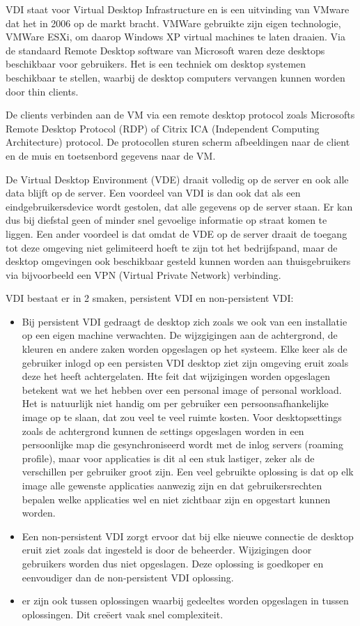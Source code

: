 VDI staat voor Virtual Desktop Infrastructure en is een uitvinding van VMware dat het in 2006 op de markt bracht. VMWare gebruikte zijn eigen technologie, VMWare ESXi, om daarop Windows XP virtual machines te laten draaien. Via de standaard Remote Desktop software van Microsoft waren deze desktops beschikbaar voor gebruikers. Het is een techniek om desktop systemen beschikbaar te stellen, waarbij de desktop computers vervangen kunnen worden door thin clients.

De clients verbinden aan de VM via een remote desktop protocol zoals Microsofts Remote Desktop Protocol (RDP) of Citrix ICA (Independent Computing Architecture) protocol. De protocollen sturen scherm afbeeldingen naar de client en de muis en toetsenbord gegevens naar de VM.

De Virtual Desktop Environment (VDE) draait volledig op de server en ook alle data blijft op de server. Een voordeel van VDI is dan ook dat als een eindgebruikersdevice wordt gestolen, dat alle gegevens op de server staan. Er kan dus bij diefstal geen of minder snel gevoelige informatie op straat komen te liggen. Een ander voordeel is dat omdat de VDE op de server draait de toegang tot deze omgeving niet gelimiteerd hoeft te zijn tot het bedrijfspand, maar de desktop omgevingen ook beschikbaar gesteld kunnen worden aan thuisgebruikers via bijvoorbeeld een VPN (Virtual Private Network) verbinding.

VDI bestaat er in 2 smaken, persistent VDI en non-persistent VDI:
\begin{itemize}
\item Bij persistent VDI gedraagt de desktop zich zoals we ook van een installatie op een eigen machine verwachten. De wijzgigingen aan de achtergrond, de kleuren en andere zaken worden opgeslagen op het systeem. Elke keer als de gebruiker inlogd op een persisten VDI desktop ziet zijn omgeving eruit zoals deze het heeft achtergelaten. Hte feit dat wijzigingen worden opgeslagen betekent wat we het hebben over een personal image of personal workload. Het is natuurlijk niet handig om per gebruiker een persoonsafhankelijke image op te slaan, dat zou veel te veel ruimte kosten. Voor desktopsettings zoals de achtergrond kunnen de settings opgeslagen worden in een persoonlijke map die gesynchroniseerd wordt met de inlog servers (roaming profile), maar voor applicaties is dit al een stuk lastiger, zeker als de verschillen per gebruiker groot zijn. Een veel gebruikte oplossing is dat op elk image alle gewenste applicaties aanwezig zijn en dat gebruikersrechten bepalen welke applicaties wel en niet zichtbaar zijn en opgestart kunnen worden.
\item Een non-persistent VDI zorgt ervoor dat bij elke nieuwe connectie de desktop eruit ziet zoals dat ingesteld is door de beheerder. Wijzigingen door gebruikers worden dus niet opgeslagen. Deze oplossing is goedkoper en eenvoudiger dan de non-persistent VDI oplossing.
\item er zijn ook tussen oplossingen waarbij gedeeltes worden opgeslagen in tussen oplossingen. Dit cre\"eert vaak snel complexiteit.
\end{itemize}
